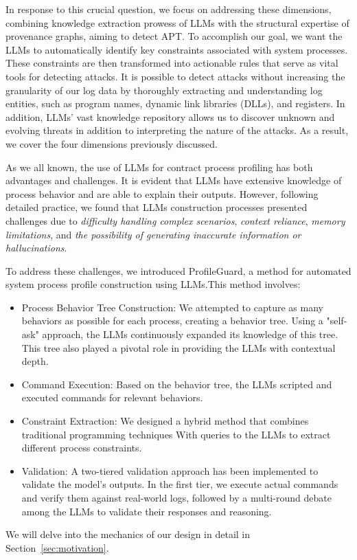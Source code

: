 In response to this crucial question, we focus on addressing these dimensions, combining knowledge extraction prowess of LLMs with the structural expertise of provenance graphs, aiming to detect APT. To accomplish our goal, we want the LLMs to automatically identify key constraints associated with system processes. These constraints are then transformed into actionable rules that serve as vital tools for detecting attacks. It is possible to detect attacks without increasing the granularity of our log data by thoroughly extracting and understanding log entities, such as program names, dynamic link libraries (DLLs), and registers. In addition, LLMs' vast knowledge repository allows us to discover unknown and evolving threats in addition to interpreting the nature of the attacks. As a result, we cover the four dimensions previously discussed.

As we all known, the use of LLMs for contract process profiling has both advantages and challenges. It is evident that LLMs have extensive knowledge of process behavior and are able to explain their outputs. However, following detailed practice, we found that LLMs construction processes presented challenges due to  \textit{difficulty handling complex scenarios}, 
\textit{context reliance}, \textit{memory limitations}, and \textit{the possibility of generating inaccurate information or hallucinations}.

To address these challenges, we introduced ProfileGuard, a method for automated system process profile construction using LLMs.This method involves:

\begin{itemize}
    \item Process Behavior Tree Construction: We attempted to capture as many behaviors as possible for each process, creating a behavior tree. Using a "self-ask" approach, the LLMs continuously expanded its knowledge of this tree. This tree also played a pivotal role in providing the LLMs with contextual depth.
    \item Command Execution: Based on the behavior tree, the LLMs scripted and executed commands for relevant behaviors. 
    \item Constraint Extraction: We designed a hybrid method that combines traditional programming techniques With queries to the LLMs to extract different process constraints. 
    \item Validation: A two-tiered validation approach has been implemented to validate the model's outputs. In the first tier, we execute actual commands and verify them against real-world logs, followed by a multi-round debate among the LLMs to validate their responses and reasoning.
\end{itemize}
We will delve into the mechanics of our design in detail in Section~\ref{sec:motivation}.


